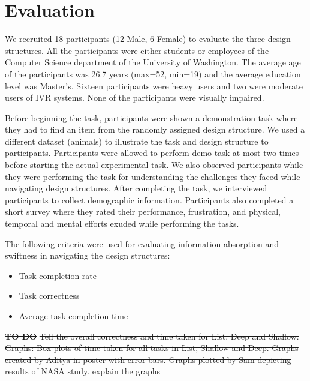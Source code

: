 \documentclass{sigchi}
\providecommand{\DIFdeltex}[1]{{\protect\color{red}\sout{#1}}}                      %
\providecommand{\DIFdelbegin}{} %
\providecommand{\DIFdel}[1]{\texorpdfstring{\DIFdeltex{#1}}{}} %
\begin{document}
\section{Evaluation}
We recruited 18 participants (12 Male, 6 Female) to evaluate the three design structures. All the participants were either students or employees of the Computer Science department of the University of Washington. The average age of the participants was 26.7 years (max=52, min=19) and the average education level was Master's. Sixteen participants were heavy users and two were moderate users of IVR systems. None of the participants were visually impaired. 

Before beginning the task, participants were shown a demonstration task where they had to find an item from the randomly assigned design structure. We used a different dataset (animals) to illustrate the task and design structure to participants. Participants were allowed to perform demo task at most two times before starting the actual experimental task. We also observed participants while they were performing the task for understanding the challenges they faced while navigating design structures. After completing the task, we interviewed participants to collect demographic information. Participants also completed a short survey where they rated their performance, frustration, and physical, temporal and mental efforts exuded while performing the tasks. 

The following criteria were used for evaluating information absorption and swiftness in navigating the design structures:
\begin{itemize}
\item Task completion rate
\item Task correctness
\item Average task completion time
\end{itemize}

\DIFdelbegin \textbf{\DIFdel{TO DO}}
\DIFdel{Tell the overall correctness and time taken for List, Deep and Shallow. 
}%
\DIFdel{Graphs: Box plots of time taken for all tasks in List, Shallow and Deep. Graphs created by Aditya in poster with error bars. Graphs plotted by Sam depicting results of NASA study. 
}%
\DIFdel{explain the graphs
}%
\end{document}
